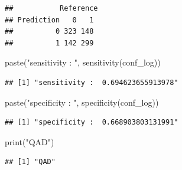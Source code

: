 \documentclass[
]{article}
\newenvironment{Shaded}{\begin{snugshade}}{\end{snugshade}}
\newcommand{\AttributeTok}[1]{\textcolor[rgb]{0.77,0.63,0.00}{#1}}
\newcommand{\FunctionTok}[1]{\textcolor[rgb]{0.00,0.00,0.00}{#1}}
\newcommand{\NormalTok}[1]{#1}
\newcommand{\OtherTok}[1]{\textcolor[rgb]{0.56,0.35,0.01}{#1}}
\newcommand{\SpecialCharTok}[1]{\textcolor[rgb]{0.00,0.00,0.00}{#1}}
\newcommand{\StringTok}[1]{\textcolor[rgb]{0.31,0.60,0.02}{#1}}
\begin{document}
\begin{Shaded}
\end{Shaded}

\begin{verbatim}
##           Reference
## Prediction   0   1
##          0 323 148
##          1 142 299
\end{verbatim}

\begin{Shaded}
\begin{Highlighting}[]
\FunctionTok{paste}\NormalTok{(}\StringTok{"sensitivity : "}\NormalTok{, }\FunctionTok{sensitivity}\NormalTok{(conf\_log))}
\end{Highlighting}
\end{Shaded}

\begin{verbatim}
## [1] "sensitivity :  0.694623655913978"
\end{verbatim}

\begin{Shaded}
\begin{Highlighting}[]
\FunctionTok{paste}\NormalTok{(}\StringTok{"specificity : "}\NormalTok{, }\FunctionTok{specificity}\NormalTok{(conf\_log))}
\end{Highlighting}
\end{Shaded}

\begin{verbatim}
## [1] "specificity :  0.668903803131991"
\end{verbatim}

\begin{Shaded}
\begin{Highlighting}[]
\FunctionTok{print}\NormalTok{(}\StringTok{"QAD"}\NormalTok{)}
\end{Highlighting}
\end{Shaded}

\begin{verbatim}
## [1] "QAD"
\end{verbatim}

\begin{Shaded}
\end{Shaded}
\end{document}
